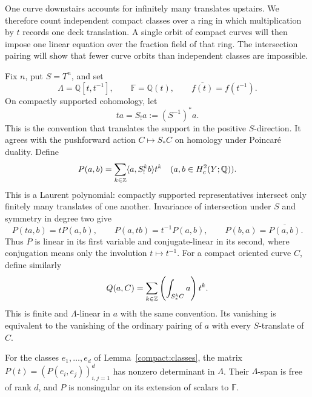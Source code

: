 One curve downstairs accounts for infinitely many translates upstairs.
We therefore count independent compact classes over a ring in which
multiplication by $t$ records one deck translation. A single orbit of
compact curves will then impose one linear equation over the fraction
field of that ring. The intersection pairing will show that fewer curve
orbits than independent classes are impossible.

Fix $n$, put $S=T^n$, and set
\[
 \Lambda=\mathbb Q[t,t^{-1}],\qquad
 \mathbb F=\mathbb Q(t),\qquad \overline{f(t)}=f(t^{-1}).
\]
On compactly supported cohomology, let
\[
 ta=S_!a:=(S^{-1})^*a.
\]
This is the convention that translates the support in the positive
$S$-direction. It agrees with the pushforward action $C\mapsto S_*C$
on homology under Poincar\'e duality. Define
\begin{equation}\label{conclusion:laurent-pairing}
 P(a,b)=\sum_{k\in\mathbb Z}\langle a,S_!^k b\rangle t^k
 \quad(a,b\in H_c^2(Y;\mathbb Q)).
\end{equation}
This is a Laurent polynomial: compactly supported representatives
intersect only finitely many translates of one another. Invariance of
intersection under $S$ and symmetry in degree two give
\begin{equation}\label{conclusion:sesquilinearity}
 P(ta,b)=tP(a,b),\qquad P(a,tb)=t^{-1}P(a,b),\qquad
 P(b,a)=\overline{P(a,b)}.
\end{equation}
Thus $P$ is linear in its first variable and conjugate-linear in its
second, where conjugation means only the involution $t\mapsto t^{-1}$.
For a compact oriented curve $C$, define similarly
\begin{equation}\label{conclusion:curve-pairing}
 Q(a,C)=\sum_{k\in\mathbb Z}\left(\int_{S_*^k C}a\right)t^k.
\end{equation}
This is finite and $\Lambda$-linear in $a$ with the same convention.
Its vanishing is equivalent to the vanishing of the ordinary pairing
of $a$ with every $S$-translate of $C$.

\begin{lemma}
\label{conclusion:pairing-rank}
For the classes $e_1,\ldots,e_d$ of Lemma~\ref{compact:classes}, the
matrix $P(t)=(P(e_i,e_j))_{i,j=1}^d$ has nonzero determinant in
$\Lambda$. Their $\Lambda$-span is free of rank $d$, and $P$ is
nonsingular on its extension of scalars to $\mathbb F$.
\end{lemma}

